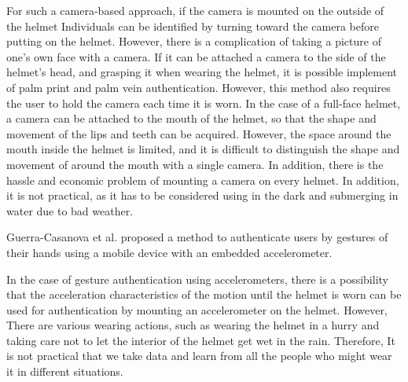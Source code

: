 \documentclass[sigchi,authordraft]{acmart}
\begin{document}
For such a camera-based approach, if the camera is mounted on the outside of the helmet Individuals can be identified by turning toward the camera before putting on the helmet. However, there is a complication of taking a picture of one's own face with a camera. If it can be attached a camera to the side of the helmet's head, and grasping it when wearing the helmet, it is possible implement of palm print and palm vein authentication. However, this method also requires the user to hold the camera each time it is worn. In the case of a full-face helmet, a camera can be attached to the mouth of the helmet, so that the shape and movement of the lips and teeth can be acquired. However, the space around the mouth inside the helmet is limited, and it is difficult to distinguish the shape and movement of around the mouth with a single camera. In addition, there is the hassle and economic problem of mounting a camera on every helmet. In addition, it is not practical, as it has to be considered using in the dark and submerging in water due to bad weather.\par


Guerra-Casanova et al.\cite{accelerometer_authentification} proposed a method to authenticate users by gestures of their hands using a mobile device with an embedded accelerometer.\par


In the case of gesture authentication using accelerometers, there is a possibility that the acceleration characteristics of the motion until the helmet is worn can be used for authentication by mounting an accelerometer on the helmet. However, There are various wearing actions, such as wearing the helmet in a hurry and taking care not to let the interior of the helmet get wet in the rain. Therefore, It is not practical that we take data and learn from all the people who might wear it in different situations.\par
\end{document}
